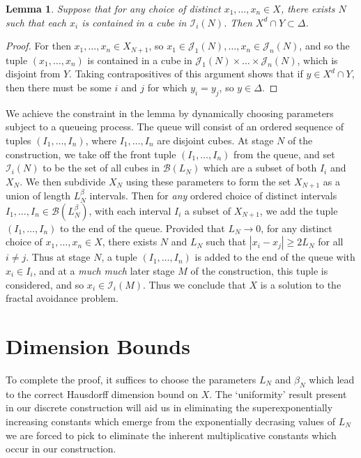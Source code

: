 \documentclass{article}
\theoremstyle{plain}
\newtheorem{lemma}{Lemma}
\theoremstyle{plain}
\begin{document}
\begin{multicols}{2}
\begin{lemma}
	Suppose that for any choice of distinct $x_1, \dots, x_n \in X$, there exists $N$ such that each $x_i$ is contained in a cube in $\mathcal{I}_i(N)$. Then $X^d \cap Y \subset \Delta$.
\end{lemma}
\begin{proof}
	For then $x_1, \dots, x_n \in X_{N+1}$, so $x_1 \in \mathcal{J}_1(N), \dots, x_n \in \mathcal{J}_n(N)$, and so the tuple $(x_1, \dots, x_n)$ is contained in a cube in $\mathcal{J}_1(N) \times \dots \times \mathcal{J}_n(N)$, which is disjoint from $Y$. Taking contrapositives of this argument shows that if $y \in X^d \cap Y$, then there must be some $i$ and $j$ for which $y_i = y_j$, so $y \in \Delta$.
\end{proof}


We achieve the constraint in the lemma by dynamically choosing parameters subject to a queueing process. The queue will consist of an ordered sequence of tuples $(I_1, \dots, I_n)$, where $I_1 ,\dots, I_n$ are disjoint cubes. At stage $N$ of the construction, we take off the front tuple $(I_1, \dots, I_n)$ from the queue, and set $\mathcal{I}_i(N)$ to be the set of all cubes in $\mathcal{B}(L_N)$ which are a subset of both $I_i$ and $X_N$. We then subdivide $X_N$ using these parameters to form the set $X_{N+1}$ as a union of length $L_N^\beta$ intervals. Then for {\it any} ordered choice of distinct intervals $I_1, \dots, I_n \in \mathcal{B}(L_N^\beta)$, with each interval $I_i$ a subset of $X_{N+1}$, we add the tuple $(I_1, \dots, I_n)$ to the end of the queue. Provided that $L_N \to 0$, for any distinct choice of $x_1, \dots, x_n \in X$, there exists $N$ and $L_N$ such that $|x_i - x_j| \geq 2 L_N$ for all $i \neq j$. Thus at stage $N$, a tuple $(I_1, \dots, I_n)$ is added to the end of the queue with $x_i \in I_i$, and at a {\it much} {\it much} later stage $M$ of the construction, this tuple is considered, and so $x_i \in \mathcal{I}_i(M)$. Thus we conclude that $X$ is a solution to the fractal avoidance problem.

\section{Dimension Bounds}

To complete the proof, it suffices to choose the parameters $L_N$ and $\beta_N$ which lead to the correct Hausdorff dimension bound on $X$. The `uniformity' result present in our discrete construction will aid us in eliminating the superexponentially increasing constants which emerge from the exponentially decrasing values of $L_N$ we are forced to pick to eliminate the inherent multiplicative constants which occur in our construction.


\end{multicols}
\end{document}
